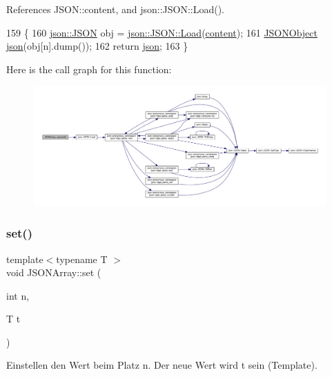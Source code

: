 References J\+S\+O\+N\+::content, and json\+::\+J\+S\+O\+N\+::\+Load().


\begin{DoxyCode}
159 \{
160     \mbox{\hyperlink{classjson_1_1_j_s_o_n}{json::JSON}} obj = \mbox{\hyperlink{classjson_1_1_j_s_o_n_a799ab1cc68cb6e2a41ec948a9a2ecc37}{json::JSON::Load}}(\mbox{\hyperlink{class_j_s_o_n_ad1ace77234b963a2994178ce7f76a181}{content}});
161     \mbox{\hyperlink{class_j_s_o_n_object}{JSONObject}} \mbox{\hyperlink{namespacejson}{json}}(obj[n].dump());
162     \textcolor{keywordflow}{return} \mbox{\hyperlink{namespacejson}{json}};
163 \}
\end{DoxyCode}
Here is the call graph for this function\+:
\nopagebreak
\begin{figure}[H]
\begin{center}
\leavevmode
\includegraphics[width=350pt]{class_j_s_o_n_array_a8c2bac974ee9b2806e9dbb78062f3abd_cgraph}
\end{center}
\end{figure}
\mbox{\label{class_j_s_o_n_array_ad012cef04a71b2e708d28f88f3c1c4e7}} 
\subsubsection{\texorpdfstring{set()}{set()}\hspace{0.1cm}{\footnotesize\ttfamily [1/4]}}
{\footnotesize\ttfamily template$<$typename T $>$ \\
void J\+S\+O\+N\+Array\+::set (\begin{DoxyParamCaption}\item[{int}]{n,  }\item[{T}]{t }\end{DoxyParamCaption})\hspace{0.3cm}{\ttfamily [inline]}}

Einstellen den Wert beim Platz n. Der neue Wert wird t sein (Template). 

